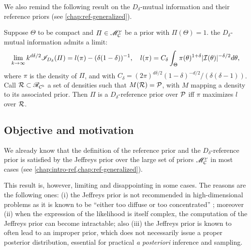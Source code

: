 We also remind the following result on the $D_\delta$-mutual information and their reference priors (see \cref{chap:ref-generalized}).
\begin{thm}\label{thm:BA:l(pi)}
    Suppose $\Theta$ to be compact and $\varPi\in\mathscr{M}^\nu_{\mathcal{C}}$ be a prior with $\varPi(\Theta)=1$. the $D_\delta$-mutual information admits a limit:
        \begin{equation}
            \lim_{k\rightarrow\infty} k^{d\delta/2} \mathscr{I}_{D_\delta}(\varPi) = l(\pi) - (\delta(1-\delta))^{-1}, \quad l(\pi) = C_\delta \int_{\Theta}\pi(\theta)^{1+\delta} |\mathcal{I}(\theta)|^{-\delta/2}  d\theta ,
        \end{equation}
        where $\pi$ is the density of $\varPi$, and with $C_\delta= (2\pi)^{d\delta/2} (1-\delta)^{-d/2}/(\delta(\delta-1))$.\\
    Call $\mathcal{R}\subset\mathscr{R}_{\mathcal{C}^b}$ a set of densities such that $M(\mathcal{R})=\mathcal{P}$, with $M$ mapping a density to its associated prior. Then
        $\varPi$ is a $D_\delta$-reference prior over $\mathcal{P}$ iff $\pi$ maximizes $l$ over $\mathcal{R}$. 
\end{thm}




\subsection{Objective and motivation}\label{sec:BA:mots}



We already know that the definition of the reference prior and the $D_\delta$-reference prior is satisfied by the Jeffreys prior over the large set of priors $\mathscr{M}^\nu_{\mathcal{C}}$ in most cases (see \cref{chap:intro-ref,chap:ref-generalized}).


This result is, however, limiting and disappointing in some cases. The reasons are the following ones: (i) the Jeffreys prior is not recommended in high-dimensional problems as it is known to be ``either too diffuse or too concentrated'' \citep{berger_overall_2015}; moreover (ii) when the expression of the likelihood is itself complex, the computation of the Jeffreys prior can become  intractable; %
also (iii) the Jeffreys prior is known to often lead to an improper prior, which does not necessarily issue a proper posterior distribution, essential for practical \emph{a posteriori} inference and sampling.

